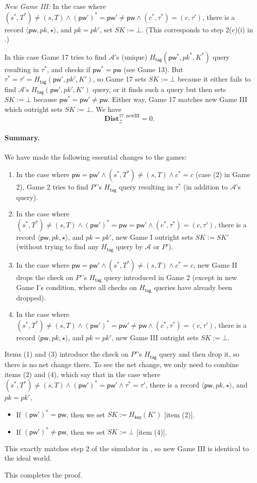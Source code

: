 \documentclass{article}
\theoremstyle{plain}
\theoremstyle{definition}
\theoremstyle{remark}
\newcommand{\adv}{\mathcal{A}}
\newcommand{\env}{\mathcal{Z}}
\newcommand{\Dist}{\mathbf{Dist}}
\newcommand{\Hkey}{H_\mathsf{key}}
\newcommand{\Htag}{H_\mathsf{tag}}
\newcommand{\pw}{\mathsf{pw}}
\begin{document}
{\color{blue}
\medskip\noindent\emph{New Game III:}
In the case where $(s^*,T^*) \neq (s,T) \land (\pw')^* = \pw' \neq \pw \land (c^*,\tau^*) = (c,\tau')$, there is a record $\langle\pw,pk,\star\rangle$, and $pk = pk'$, set $SK := \bot$. (This corresponds to step 2(c)(i) in .)

In this case Game 17 tries to find $\adv$'s (unique) $\Htag(\pw^*,pk^*,K^*)$ query resulting in $\tau^*$, and checks if $\pw^* = \pw$ (see Game 13). But $\tau^* = \tau' = \Htag(\pw',pk',K')$, so Game 17 sets $SK := \bot$ because it either fails to find $\adv$'s $\Htag(\pw',pk',K')$ query, or it finds such a query but then sets $SK := \bot$ because $\pw^* = \pw' \neq \pw$. Either way, Game 17 matches new Game III which outright sets $SK := \bot$. We have
\[
\Dist_\env^{17,\text{newIII}} = 0.
\]

\paragraph{Summary.}
We have made the following essential changes to the games:
\begin{enumerate}
  \item In the case where $\pw = \pw' \land (s^*,T^*) \neq (s,T) \land c^* = c$ (case (2) in Game 2), Game 2 tries to find $P'$'s $\Htag$ query resulting in $\tau^*$ (in addition to $\adv$'s query).
  \item In the case where $(s^*,T^*) \neq (s,T) \land (\pw')^* = \pw = \pw' \land (c^*,\tau^*) = (c,\tau')$, there is a record $\langle\pw,pk,\star\rangle$, and $pk = pk'$, new Game I outright sets $SK := SK'$ (without trying to find any $\Htag$ query by $\adv$ or $P'$).
  \item In the case where $\pw = \pw' \land (s^*,T^*) \neq (s,T) \land c^* = c$, new Game II drops the check on $P'$'s $\Htag$ query introduced in Game 2 (except in new Game I's condition, where all checks on $\Htag$ queries have already been dropped).
  \item In the case where $(s^*,T^*) \neq (s,T) \land (\pw')^* = \pw' \neq \pw \land (c^*,\tau^*) = (c,\tau')$, there is a record $\langle\pw,pk,\star\rangle$, and $pk = pk'$, new Game III outright sets $SK := \bot$.
\end{enumerate}

Items (1) and (3) introduce the check on $P'$'s $\Htag$ query and then drop it, so there is no net change there. To see the net change, we only need to combine items (2) and (4), which say that in the case where $(s^*,T^*) \neq (s,T) \land (\pw')^* = \pw' \land \tau^* = \tau'$, there is a record $\langle\pw,pk,\star\rangle$, and $pk = pk'$,
\begin{itemize}
  \item If $(\pw')^* = \pw$, then we set $SK := \Hkey(K')$ [item (2)].
  \item If $(\pw')^* \neq \pw$, then we set $SK := \bot$ [item (4)].
\end{itemize}
This exactly matches step 2 of the simulator in , so new Game III is identical to the ideal world.} This completes the proof.
\end{document}
